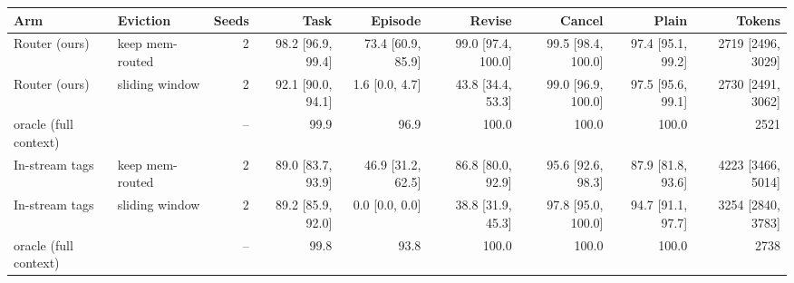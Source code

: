 \begin{tabular}{llrrrrrrr}
\toprule
Arm & Eviction & Seeds & Task & Episode & Revise & Cancel & Plain & Tokens \\
\midrule
Router (ours) & keep mem-routed & 2 & 98.2 {\scriptsize[96.9, 99.4]} & 73.4 {\scriptsize[60.9, 85.9]} & 99.0 {\scriptsize[97.4, 100.0]} & 99.5 {\scriptsize[98.4, 100.0]} & 97.4 {\scriptsize[95.1, 99.2]} & 2719 {\scriptsize[2496, 3029]} \\
Router (ours) & sliding window & 2 & 92.1 {\scriptsize[90.0, 94.1]} & 1.6 {\scriptsize[0.0, 4.7]} & 43.8 {\scriptsize[34.4, 53.3]} & 99.0 {\scriptsize[96.9, 100.0]} & 97.5 {\scriptsize[95.6, 99.1]} & 2730 {\scriptsize[2491, 3062]} \\
\quad oracle (full context) & & -- & {\color{gray}99.9} & {\color{gray}96.9} & {\color{gray}100.0} & {\color{gray}100.0} & {\color{gray}100.0} & {\color{gray}2521} \\
In-stream tags & keep mem-routed & 2 & 89.0 {\scriptsize[83.7, 93.9]} & 46.9 {\scriptsize[31.2, 62.5]} & 86.8 {\scriptsize[80.0, 92.9]} & 95.6 {\scriptsize[92.6, 98.3]} & 87.9 {\scriptsize[81.8, 93.6]} & 4223 {\scriptsize[3466, 5014]} \\
In-stream tags & sliding window & 2 & 89.2 {\scriptsize[85.9, 92.0]} & 0.0 {\scriptsize[0.0, 0.0]} & 38.8 {\scriptsize[31.9, 45.3]} & 97.8 {\scriptsize[95.0, 100.0]} & 94.7 {\scriptsize[91.1, 97.7]} & 3254 {\scriptsize[2840, 3783]} \\
\quad oracle (full context) & & -- & {\color{gray}99.8} & {\color{gray}93.8} & {\color{gray}100.0} & {\color{gray}100.0} & {\color{gray}100.0} & {\color{gray}2738} \\
\bottomrule
\end{tabular}
